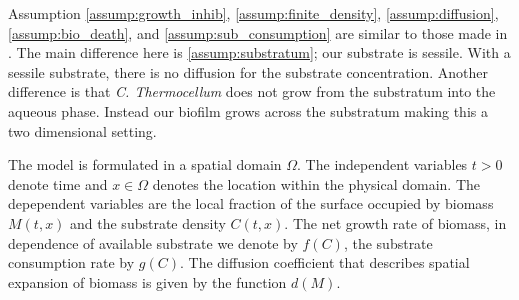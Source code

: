 Assumption \ref{assump:growth_inhib}, \ref{assump:finite_density}, \ref{assump:diffusion}, \ref{assump:bio_death}, and \ref{assump:sub_consumption} are similar to those made in \cite{eberl2001deterministic}.
The main difference here is \ref{assump:substratum}; our substrate is sessile.
With a sessile substrate, there is no diffusion for the substrate concentration.
Another difference is that \textit{C. Thermocellum} does not grow from the substratum into the aqueous phase.
Instead our biofilm grows across the substratum making this a two dimensional setting.

The model is formulated in a spatial domain $\Omega$. 
The independent variables $t > 0$ denote time and $x \in \Omega$ denotes the location within the physical domain.
The depependent variables are the local fraction of the surface occupied by biomass $M(t,x)$ and the substrate density $C(t,x)$.
The net growth rate of biomass, in dependence of available substrate we denote by $f(C)$, the substrate consumption rate by $g(C)$.
The diffusion coefficient that describes spatial expansion of biomass is given by the function $d(M)$.

